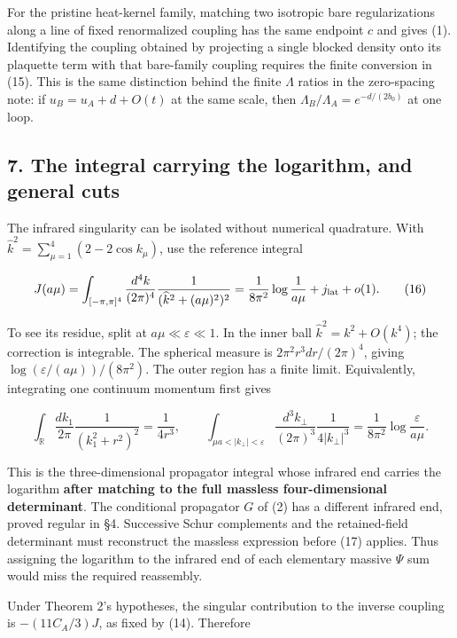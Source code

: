 \documentclass[11pt,a4paper]{article}
\begin{document}
For the pristine heat-kernel family, matching two isotropic bare
regularizations along a line of fixed renormalized coupling has the same
endpoint \(c\) and gives (1). Identifying the coupling obtained by
projecting a single blocked density onto its plaquette term with that
bare-family coupling requires the finite conversion in (15). This is the
same distinction behind the finite \(\Lambda\) ratios in the
zero-spacing note: if \(u_B=u_A+d+O(t)\) at the same scale, then
\(\Lambda_B/\Lambda_A=e^{-d/(2b_0)}\) at one loop.

\hypertarget{the-integral-carrying-the-logarithm-and-general-cuts}{%
\subsection{7. The integral carrying the logarithm, and general
cuts}\label{the-integral-carrying-the-logarithm-and-general-cuts}}

The infrared singularity can be isolated without numerical quadrature.
With \(\widehat k^2=\sum_{\mu=1}^4(2-2\cos k_\mu)\), use the reference
integral

\[J(a\mu)=\int_{[-\pi,\pi]^4}\frac{d^4k}{(2\pi)^4}
 \frac1{(\widehat k^2+(a\mu)^2)^2}
 =\frac1{8\pi^2}\log\frac1{a\mu}+j_{\rm lat}+o(1).
\tag{16}\]

To see its residue, split at \(a\mu\ll\varepsilon\ll1\). In the inner
ball \(\widehat k^2=k^2+O(k^4)\); the correction is integrable. The
spherical measure is \(2\pi^2r^3dr/(2\pi)^4\), giving
\(\log(\varepsilon/(a\mu))/(8\pi^2)\). The outer region has a finite
limit. Equivalently, integrating one continuum momentum first gives

\[\int_{\mathbb R}\frac{dk_1}{2\pi}\frac1{(k_1^2+r^2)^2}
 =\frac1{4r^3},\qquad
 \int_{\mu a<|k_\perp|<\varepsilon}
 \frac{d^3k_\perp}{(2\pi)^3}\frac1{4|k_\perp|^3}
 =\frac1{8\pi^2}\log\frac\varepsilon{a\mu}.\tag{17}\]

This is the three-dimensional propagator integral whose infrared end
carries the logarithm \textbf{after matching to the full massless
four-dimensional determinant}. The conditional propagator \(G\) of (2)
has a different infrared end, proved regular in §4. Successive Schur
complements and the retained-field determinant must reconstruct the
massless expression before (17) applies. Thus assigning the logarithm to
the infrared end of each elementary massive \(\Psi\) sum would miss the
required reassembly.

Under Theorem 2's hypotheses, the singular contribution to the inverse
coupling is \(-(11C_A/3)J\), as fixed by (14). Therefore
\end{document}
